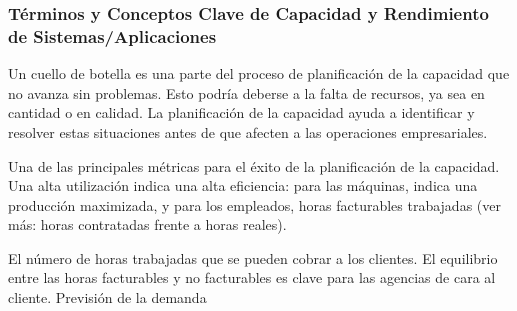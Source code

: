 \documentclass[
  paper=a4,
  ,captions=tableheading
]{scrartcl}
\providecommand{\tightlist}{%
  \setlength{\itemsep}{0pt}\setlength{\parskip}{0pt}}
\renewenvironment{quote}{\begin{customblockquote}\list{}{\rightmargin=0em\leftmargin=0em}%
\item\relax\color{blockquote-text}\ignorespaces}{\unskip\unskip\endlist\end{customblockquote}}
\begin{document}
\begin{quote}
\end{quote}

\subsubsection{Términos y Conceptos Clave de Capacidad y Rendimiento de
Sistemas/Aplicaciones}\label{sec:tuxe9rminos-y-conceptos-clave-de-capacidad-y-rendimiento-de-sistemasaplicaciones}

\begin{description}
\tightlist
\item[Cuellos de botella]
Un cuello de botella es una parte del proceso de planificación de la
capacidad que no avanza sin problemas. Esto podría deberse a la falta de
recursos, ya sea en cantidad o en calidad. La planificación de la
capacidad ayuda a identificar y resolver estas situaciones antes de que
afecten a las operaciones empresariales.
\item[Utilización de recursos]
Una de las principales métricas para el éxito de la planificación de la
capacidad. Una alta utilización indica una alta eficiencia: para las
máquinas, indica una producción maximizada, y para los empleados, horas
facturables trabajadas (ver más: horas contratadas frente a horas
reales).
\item[Horas facturables]
El número de horas trabajadas que se pueden cobrar a los clientes. El
equilibrio entre las horas facturables y no facturables es clave para
las agencias de cara al cliente. Previsión de la demanda


\end{description}
\end{document}
